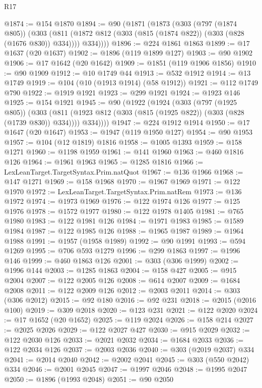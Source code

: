 \begin{lexlean}{R17}
\begin{coremodule}
{{{{{{{{{{{{{{{{{{{{{{{{{{{{{{{{{{{{{{{{{{{{{{{{{{{{{{{{{{{{{{{{{{{{{{{{{{{{{{{{{{{{{{{{{{{{{{{{{{{{{{{{{{{@1874 := @154 @1870
@1894 := @90
    (@1871
      (@1873
        (@303
          (@797 (@1874 @805))
          (@303
            (@811 (@1872 @812 (@303 (@815 (@1874 @822)) (@303 (@828 (@1676 @830)) @334))))
            @334))))
@1896 := @224 @1861 @1863
@1899 := @17 @1637 (@20 @1637)
@1902 := @1896 (@119 @1899 @127)
@1903 := @90 @1902
@1906 := @17 @1642 (@20 @1642)
@1909 := @1851 (@119 @1906 @1856)
@1910 := @90 @1909
@1912 := @10 @1749 @44
@1913 := @532 @1912
@1914 := @13 @1749
@1919 := @104 (@10 (@1913 @1914) (@58 @1912))
@1921 := @112 @1749 @790
@1922 := @1919 @1921
@1923 := @299 @1921
@1924 := @1923 @146
@1925 := @154 @1921
@1945 := @90
    (@1922
      (@1924
        (@303
          (@797 (@1925 @805))
          (@303
            (@811 (@1923 @812 (@303 (@815 (@1925 @822)) (@303 (@828 (@1739 @830)) @334))))
            @334))))
@1947 := @224 @1912 @1914
@1950 := @17 @1647 (@20 @1647)
@1953 := @1947 (@119 @1950 @127)
@1954 := @90 @1953
@1957 := @104 (@12 @1819) @1816
@1958 := @1005 @1393
@1959 := @158 @1271
@1960 := @1198 @1959
@1961 := @141 @1960
@1963 := @460 @1816 @126
@1964 := @1961 @1963
@1965 := @1285 @1816
@1966 := LexLeanTarget.TargetSyntax.Prim.natQuot
@1967 := @136 @1966
@1968 := @147 @1271
@1969 := @158 @1968
@1970 := @1967 @1969
@1971 := @122 @1970
@1972 := LexLeanTarget.TargetSyntax.Prim.natRem
@1973 := @136 @1972
@1974 := @1973 @1969
@1976 := @122 @1974 @126
@1977 := @125 @1976
@1978 := @1572 @1977
@1980 := @122 @1978 @1405
@1981 := @765 @1980
@1983 := @122 @1981 @126
@1984 := @1971 @1983
@1985 := @1589 @1984
@1987 := @122 @1985 @126
@1988 := @1965 @1987
@1989 := @1964 @1988
@1991 := @1957 (@1958 @1989)
@1992 := @90 @1991
@1993 := @594 @1269
@1995 := @706 @593 @1279
@1996 := @299 @1863
@1997 := @1996 @146
@1999 := @460 @1863 @126
@2001 := @303 (@306 @1999)
@2002 := @1996 @144
@2003 := @1285 @1863
@2004 := @158 @427
@2005 := @915 @2004
@2007 := @122 @2005 @126
@2008 := @614 @2007
@2009 := @1684 @2008
@2011 := @122 @2009 @126
@2012 := @2003 @2011
@2014 := @303 (@306 @2012)
@2015 := @92 @180
@2016 := @92 @231
@2018 := @2015 (@2016 @100)
@2019 := @309 @2018
@2020 := @123 @231
@2021 := @122 @2020
@2024 := @17 @1652 (@20 @1652)
@2025 := @119 @2024
@2026 := @158 @214
@2027 := @2025 @2026
@2029 := @122 @2027 @427
@2030 := @915 @2029
@2032 := @122 @2030 @126
@2033 := @2021 @2032
@2034 := @1684 @2033
@2036 := @122 @2034 @126
@2037 := @2003 @2036
@2040 := @303 (@2019 @2037) @334
@2041 := @2014 @2040
@2042 := @2002 @2041
@2045 := @303 (@550 @2042) @334
@2046 := @2001 @2045
@2047 := @1997 @2046
@2048 := @1995 @2047
@2050 := @1896 (@1993 @2048)
@2051 := @90 @2050
}}}}}}}}}}}}}}}}}}}}}}}}}}}}}}}}}}}}}}}}}}}}}}}}}}}}}}}}}}}}}}}}}}}}}}}}}}}}}}}}}}}}}}}}}}}}}}}}}}}}}}}}}}}
\end{coremodule}
\end{lexlean}
